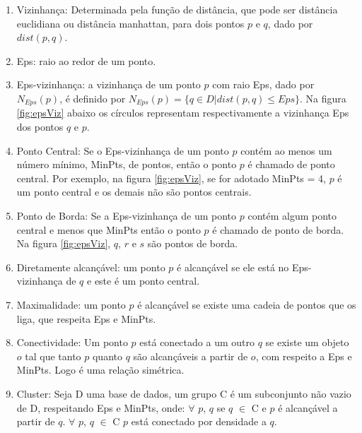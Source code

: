 \begin{enumerate}
	\item Vizinhança: Determinada pela função de distância, que pode ser distância euclidiana ou distância manhattan, para dois pontos ${p}$ e ${q}$, dado por ${dist(p,q)}$.
	\item Eps: raio ao redor de um ponto. 
	\item Eps-vizinhança: a vizinhança de um ponto ${p}$ com raio Eps, dado por ${N_{Eps}(p)}$, é definido por ${N_{Eps}(p) = \big\{ q \in D | dist(p, q)  \leqslant Eps\big\} }$. Na figura \ref{fig:epsViz} abaixo os círculos representam respectivamente a vizinhança Eps dos pontos ${q}$ e ${p}$.
	\item Ponto Central: Se o Eps-vizinhança de um ponto ${p}$ contém ao menos um número mínimo, MinPts, de pontos, então o ponto ${p}$ é chamado de ponto central.
	Por exemplo, na figura \ref{fig:epsViz}, se for adotado MinPts = 4, ${p}$ é um ponto central e os demais não são pontos centrais.
	\item Ponto de Borda: Se a Eps-vizinhança de um ponto ${p}$ contém algum ponto central e menos que MinPts então o ponto ${p}$ é chamado de ponto de borda. Na figura  \ref{fig:epsViz}, ${q}$, ${r}$ e ${s}$ são pontos de borda.
	\item Diretamente alcançável: um ponto ${p}$ é alcançável se ele está no Eps-vizinhança de ${q}$ e este é um ponto central.
	\item Maximalidade: um ponto ${p}$ é alcançável se existe uma cadeia de pontos que os liga, que respeita Eps e MinPts.
	\item Conectividade: Um ponto ${p}$ está conectado a um outro ${q}$ se existe um objeto ${o}$ tal que tanto ${p}$ quanto ${q}$ são alcançáveis a partir de ${o}$, com respeito a Eps e MinPts. Logo é uma relação simétrica.
	\item Cluster: Seja D uma base de dados, um grupo C é um subconjunto não vazio de D, respeitando Eps e MinPts, onde:
		\subitem ${\forall}$ ${p}$, ${q}$ se ${q}$ ${\in}$ C e ${p}$ é alcançável a partir de ${q}$.
		\subitem ${\forall}$ ${p}$, ${q}$ ${\in}$ C ${p}$ está conectado por densidade a ${q}$.
\end{enumerate}

\begin{figure}[!h]
	\centering
\end{figure}

